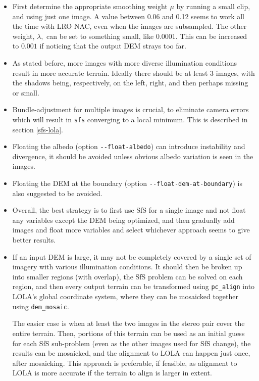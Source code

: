 \begin{itemize}{}

\item First determine the appropriate smoothing weight $\mu$ by running a
small clip, and using just one image. A value between 0.06 and 0.12 seems to work 
all the time with LRO NAC, even when the images are subsampled. The other weight, $\lambda,$ can
be set to something small, like $0.0001.$ This can be increased to $0.001$ if noticing
that the output DEM strays too far. 

\item As stated before, more images with more diverse illumination conditions
result in more accurate terrain. Ideally there should be at least 3 images, with the shadows
being, respectively, on the left, right, and then perhaps missing or small. 

\item Bundle-adjustment for multiple images is crucial, to eliminate
  camera errors which will result in \texttt{sfs} converging to a local
  minimum. This is described in section \ref{sfs-lola}.

\item Floating the albedo (option \texttt{-\/-float-albedo}) can
  introduce instability and divergence, it should be avoided unless
  obvious albedo variation is seen in the images.

\item Floating the DEM at the boundary (option
  \texttt{-\/-float-dem-at-boundary}) is also suggested to be avoided.

\item Overall, the best strategy is to first use SfS for a single image
  and not float any variables except the DEM being optimized, and then
  gradually add images and float more variables and select whichever
  approach seems to give better results.

\item If an input DEM is large, it may not be completely covered by a
  single set of imagery with various illumination conditions.  It should
  then be broken up into smaller regions (with overlap), the SfS problem
  can be solved on each region, and then every output terrain can be
  transformed using \texttt{pc\_align} into LOLA's global coordinate
  system, where they can be mosaicked together using
  \texttt{dem\_mosaic}. 

  The easier case is when at least the two images in the stereo pair
  cover the entire terrain. Then, portions of this terrain can be used
  as an initial guess for each SfS sub-problem (even as the other images
  used for SfS change), the results can be mosaicked, and the alignment
  to LOLA can happen just once, after mosaicking. This approach is
  preferable, if feasible, as alignment to LOLA is more accurate if the
  terrain to align is larger in extent.
\end{itemize}
